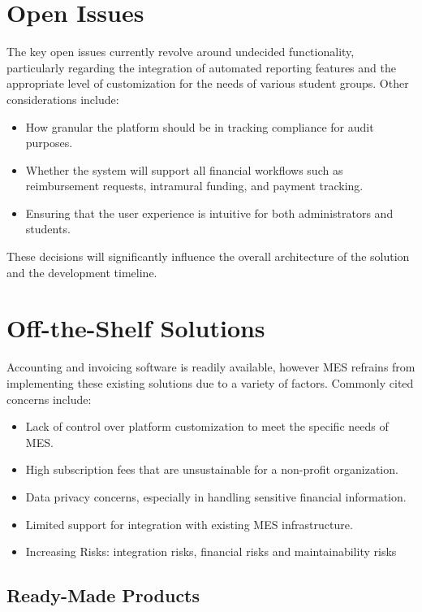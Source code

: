 \documentclass[12pt]{article}
\begin{document}
\newpage

\section{Open Issues}
The key open issues currently revolve around undecided functionality, particularly regarding the integration of automated reporting features and the appropriate level of customization for the needs of various student groups. Other considerations include:
\begin{itemize}
    \item How granular the platform should be in tracking compliance for audit purposes.
    \item Whether the system will support all financial workflows such as reimbursement requests, intramural funding, and payment tracking.
    \item Ensuring that the user experience is intuitive for both administrators and students.
\end{itemize}
These decisions will significantly influence the overall architecture of the solution and the development timeline.


\section{Off-the-Shelf Solutions}

Accounting and invoicing software is readily available, however MES refrains from implementing these existing solutions due to a variety of factors. Commonly cited concerns include:
\begin{itemize}
    \item Lack of control over platform customization to meet the specific needs of MES.
    \item High subscription fees that are unsustainable for a non-profit organization.
    \item Data privacy concerns, especially in handling sensitive financial information.
    \item Limited support for integration with existing MES infrastructure.
    \item Increasing Risks: integration risks, financial risks and maintainability risks
\end{itemize}



\subsection{Ready-Made Products}
\end{document}
